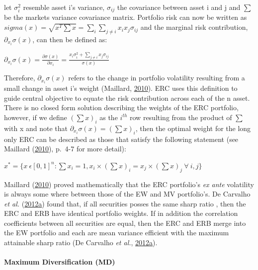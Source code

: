 \documentclass[11pt,preprint, authoryear]{elsarticle}
\numberwithin{equation}{section}
\numberwithin{figure}{section}
\numberwithin{table}{section}
\begin{document}
let \(\sigma_i^2\) resemble asset i's variance, \(\sigma_{ij}\) the
covariance between asset i and j and \(\sum\) be the markets variance
covariance matrix. Portfolio risk can now be written as
\(sigma(x)=\sqrt{x^T\sum x}=\sum_i\sum_{j\neq i}x_ix_j\sigma_{ij}\) and
the marginal risk contribution, \(\partial_{x_i}\sigma(x)\), can then be
defined as:

\begin{center}
$\partial_{x_i}\sigma(x)=\frac{\partial\sigma(x)}{\partial x_i}=\frac{x_i\sigma_i^2+\sum_{j\neq i}x_j\sigma_{ij}}{\sigma(x)}$ 
\end{center}

Therefore, \(\partial_{x_i}\sigma(x)\) refers to the change in portfolio
volatility resulting from a small change in asset i's weight (Maillard,
\protect\hyperlink{ref-maillard2010}{2010}). ERC uses this definition to
guide central objective to equate the risk contribution across each of
the n asset. There is no closed form solution describing the weights of
the ERC portfolio, however, if we define \((\sum x)_i\) as the
\(i^{th}\) row resulting from the product of \(\sum\) with x and note
that \(\partial_{x_i}\sigma(x)=(\sum x)_i\), then the optimal weight for
the long only ERC can be described as those that satisfy the following
statement (see Maillard (\protect\hyperlink{ref-maillard2010}{2010}),
p.~4-7 for more detail):

\begin{center}
$x^*=\{x \ \epsilon[0,1]^n:\sum x_i=1, x_i \times (\sum x)_i=x_j \times (\sum x)_j \ \forall  \ i,j \}$ 
\end{center}

Maillard (\protect\hyperlink{ref-maillard2010}{2010}) proved
mathematically that the ERC portfolio's \emph{ex ante} volatility is
always some where between those of the EW and MV portfolio's. De
Carvalho \emph{et al.}
(\protect\hyperlink{ref-leote}{2012}\protect\hyperlink{ref-leote}{a})
found that, if all securities posses the same sharp ratio , then the ERC
and ERB have identical portfolio weights. If in addition the correlation
coefficients between all securities are equal, then the ERC and ERB
merge into the EW portfolio and each are mean variance efficient with
the maximum attainable sharp ratio (De Carvalho \emph{et al.},
\protect\hyperlink{ref-leote}{2012}\protect\hyperlink{ref-leote}{a}).

\hypertarget{maximum-diversification-md}{%
\paragraph{Maximum Diversification
(MD)}\label{maximum-diversification-md}}
\end{document}
